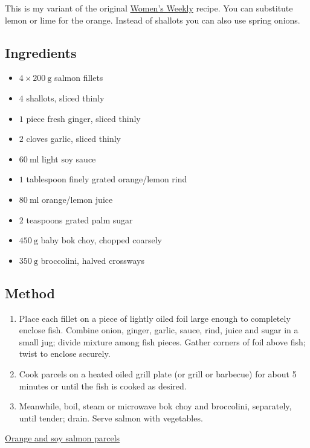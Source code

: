 \documentclass[11pt,a4paper]{article}
\begin{document}
This is my variant of the original
\href{https://www.womensweeklyfood.com.au/}{Women's Weekly} recipe. You can
substitute lemon or lime for the orange. Instead of shallots you can also use
spring onions.

\subsection*{Ingredients}

\begin{multicols}{2}

\begin{itemize}
  \item $ 4 \times \qty{200}{\gram} $ salmon fillets
  \item $ 4 $ shallots, sliced thinly
  \item $ 1 $ piece fresh ginger, sliced thinly
  \item $ 2 $ cloves garlic, sliced thinly
  \item $ \qty{60}{\ml} $ light soy sauce
  \item $ 1 $ tablespoon finely grated orange/lemon rind
  \item $ \qty{80}{\ml} $ orange/lemon juice
  \item $ 2 $ teaspoons grated palm sugar
\end{itemize}

\columnbreak{}

\begin{itemize}
  \item $ \qty{450}{\gram} $ baby bok choy, chopped coarsely
  \item $ \qty{350}{\gram} $ broccolini, halved crossways
\end{itemize}

\end{multicols}

\medskip

\subsection*{Method}

\begin{enumerate}
  \item Place each fillet on a piece of lightly oiled foil large enough to
  completely enclose fish. Combine onion, ginger, garlic, sauce, rind,
  juice and sugar in a small jug; divide mixture among fish pieces.
  Gather corners of foil above fish; twist to enclose securely.
  
  \item Cook parcels on a heated oiled grill plate (or grill or barbecue) for
  about 5 minutes or until the fish is cooked as desired.
  
  \item Meanwhile, boil, steam or microwave bok choy and broccolini,
  separately, until tender; drain. Serve salmon with vegetables.
\end{enumerate}

\href{https://www.womensweeklyfood.com.au/recipe/baking/orange-and-soy-salmon-parcels-7769/}{Orange and soy salmon parcels}
\end{document}
